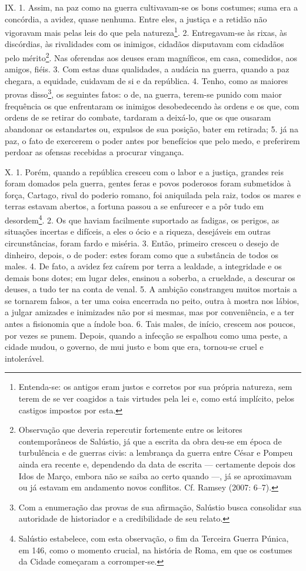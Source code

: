 IX. 1. Assim, na paz como na guerra cultivavam-se os bons costumes; suma era a
concórdia, a avidez, quase nenhuma. Entre eles, a justiça e a retidão não
vigoravam mais pelas leis do que pela natureza\footnote{Entenda-se: os antigos
eram justos e corretos por sua própria natureza, sem terem de se ver coagidos a
tais virtudes pela lei e, como está implícito, pelos castigos impostos por
esta.}. 2. Entregavam-se às rixas, às discórdias, às rivalidades com os
inimigos, cidadãos disputavam com cidadãos pelo mérito\footnote{Observação que
deveria repercutir fortemente entre os leitores contemporâneos de Salústio, já
que a escrita da obra deu-se em época de turbulência e de guerras civis: a
lembrança da guerra entre César e Pompeu ainda era recente e, dependendo da
data de escrita --- certamente depois dos Idos de Março, embora não se saiba ao
certo quando ---, já se aproximavam ou já estavam
em andamento novos conflitos. Cf. Ramsey (2007: 6--7).}. Nas oferendas aos deuses eram magníficos, em
casa, comedidos, aos amigos, fiéis. 3. Com estas duas qualidades, a audácia na
guerra, quando a paz chegara, a equidade, cuidavam de si e da república. 4. Tenho,
como as maiores provas disso\footnote{Com a enumeração das provas de sua
afirmação, Salústio busca consolidar sua autoridade de historiador e a
credibilidade de seu relato.}, os seguintes fatos: o de, na guerra, terem-se
punido com maior frequência os que enfrentaram os inimigos desobedecendo às
ordens e os que, com ordens de se retirar do combate, tardaram a deixá-lo, que
os que ousaram abandonar os estandartes ou, expulsos de sua posição, bater em
retirada; 5. já na paz, o fato de exercerem o poder antes por benefícios que
pelo medo, e preferirem perdoar as ofensas recebidas a procurar vingança. 

X. 1. Porém, quando a república cresceu com o labor e a justiça, grandes reis
foram domados pela guerra, gentes feras e povos poderosos foram submetidos à
força, Cartago, rival do poderio romano, foi aniquilada pela raiz, todos os
mares e terras estavam abertos, a fortuna passou a se enfurecer e a pôr tudo em
desordem\footnote{Salústio estabelece, com esta observação, o fim da Terceira
Guerra Púnica, em 146, como o momento crucial, na história de Roma, em que os
costumes da Cidade começaram a corromper-se.}. 2. Os que haviam facilmente
suportado as fadigas, os perigos, as situações incertas e difíceis, a eles o
ócio e a riqueza, desejáveis em outras circunstâncias, foram fardo e miséria.
3. Então, primeiro cresceu o desejo de dinheiro, depois, o de poder: estes
foram como que a substância de todos os males. 4. De fato, a avidez fez caírem
por terra a lealdade, a integridade e os demais bons dotes; em lugar deles,
ensinou a soberba, a crueldade, a descurar os deuses, a tudo ter na conta de
venal. 5. A ambição constrangeu muitos mortais a se tornarem falsos, a ter uma
coisa encerrada no peito, outra à mostra nos lábios, a julgar amizades e
inimizades não por si mesmas, mas por conveniência, e a ter antes a fisionomia
que a índole boa. 6. Tais males, de início, crescem aos poucos, por vezes se
punem. Depois, quando a infecção se espalhou como uma peste, a cidade mudou, o
governo, de mui justo e bom que era, tornou-se cruel e intolerável.

